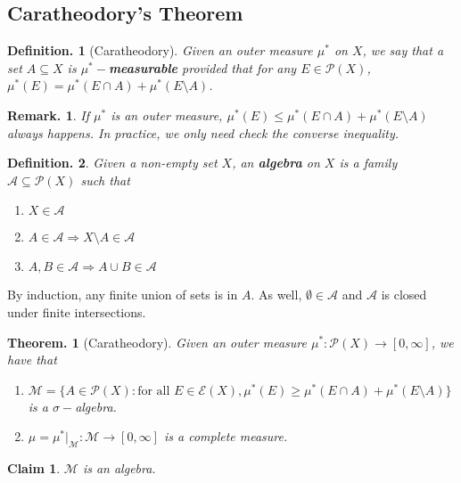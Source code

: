 \documentclass[11pt, a4paper]{memoir}
\theoremstyle{change}
\newtheorem{theorem}{Theorem.}[section]
\theoremstyle{plain}
\newtheorem{claim}{Claim}
\theoremstyle{nonumberplain}
\newtheorem{definition}{Definition.}
\newtheorem{remark}{Remark.}
\numberwithin{equation}{section}
\begin{document}
\subsection{Caratheodory's Theorem}
\begin{definition}[Caratheodory]
    Given an outer measure $\mu^*$ on $X$, we say that a set $A\subseteq X$ is \textbf{$\mu^*-$measurable} provided that for any $E\in\mathcal{P}(X)$, $\mu^*(E)=\mu^*(E\cap A)+\mu^*(E\setminus A)$.
\end{definition}
\begin{remark}
    If $\mu^*$ is an outer measure, $\mu^*(E)\leq\mu^*(E\cap A)+\mu^*(E\setminus A)$ always happens.
    In practice, we only need check the converse inequality.
\end{remark}
\begin{definition}
    Given a non-empty set $X$, an \textbf{algebra} on $X$ is a family $\mathcal{A}\subseteq\mathcal{P}(X)$ such that
    \begin{enumerate}[nl,r]
        \item $X\in\mathcal{A}$
        \item $A\in\mathcal{A}\Rightarrow X\setminus A\in\mathcal{A}$
        \item $A,B\in\mathcal{A}\Rightarrow A\cup B\in\mathcal{A}$
    \end{enumerate}
\end{definition}
By induction, any finite union of sets is in $A$.
As well, $\emptyset\in\mathcal{A}$ and $\mathcal{A}$ is closed under finite intersections.
\begin{theorem}[Caratheodory]\label{thm:carat}
    Given an outer measure $\mu^*:\mathcal{P}(X)\to[0,\infty]$, we have that
    \begin{enumerate}[nl,r]
        \item $\mathcal{M}=\bigl\{A\in\mathcal{P}(X):\text{for all }E\in\mathcal{E}(X),\mu^*(E)\geq\mu^*(E\cap A)+\mu^*(E\setminus A)\bigr\}$ is a $\sigma-$algebra.
        \item $\mu=\mu^*|_{\mathcal{M}}:\mathcal{M}\to[0,\infty]$ is a complete measure.
    \end{enumerate}
\end{theorem}
\begin{claim}
    $\mathcal{M}$ is an algebra.
\end{claim}
\end{document}
